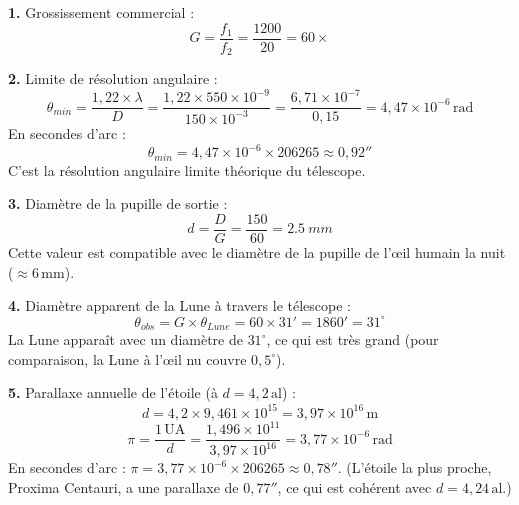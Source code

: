 \documentclass[12pt,a4paper]{article}
\begin{document}
\begin{boitecorrige}
\textbf{1.} Grossissement commercial :
\[
G = \frac{f_1}{f_2} = \frac{1200}{20} = 60\times
\]

\textbf{2.} Limite de résolution angulaire :
\[
\theta_{min} = \frac{1{,}22\times\lambda}{D} = \frac{1{,}22\times550\times10^{-9}}{150\times10^{-3}} = \frac{6{,}71\times10^{-7}}{0{,}15} = 4{,}47\times10^{-6}\,\text{rad}
\]
En secondes d'arc :
\[
\theta_{min} = 4{,}47\times10^{-6}\times206265 \approx 0{,}92''
\]
C'est la résolution angulaire limite théorique du télescope.

\textbf{3.} Diamètre de la pupille de sortie :
\[
d = \frac{D}{G} = \frac{150}{60} = \qty{2.5}{mm}
\]
Cette valeur est compatible avec le diamètre de la pupille de l'\oe{}il humain la nuit ($\approx 6\,\text{mm}$).

\textbf{4.} Diamètre apparent de la Lune à travers le télescope :
\[
\theta_{obs} = G\times\theta_{Lune} = 60\times31' = 1860' = 31^\circ
\]
La Lune apparaît avec un diamètre de $31^\circ$, ce qui est très grand (pour comparaison, la Lune à l'\oe{}il nu couvre $0{,}5^\circ$).

\textbf{5.} Parallaxe annuelle de l'étoile (à $d = 4{,}2\,\text{al}$) :
\[
d = 4{,}2 \times 9{,}461\times10^{15} = 3{,}97\times10^{16}\,\text{m}
\]
\[
\pi = \frac{1\,\text{UA}}{d} = \frac{1{,}496\times10^{11}}{3{,}97\times10^{16}} = 3{,}77\times10^{-6}\,\text{rad}
\]
En secondes d'arc : $\pi = 3{,}77\times10^{-6}\times206265 \approx 0{,}78''$. (L'étoile la plus proche, Proxima Centauri, a une parallaxe de $0{,}77''$, ce qui est cohérent avec $d = 4{,}24\,\text{al}$.)
\end{boitecorrige}

\ifdefined\inMainDoc\else
\end{document}
